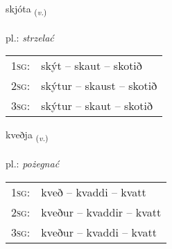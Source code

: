 \documentclass[frontgrid, backgrid]{flacards}\usepackage[]{graphicx}\usepackage[]{xcolor}
\begin{document}
\renewcommand{\blhead}{\vskip5pt {\small\bfseries\footnotesize Sagnorð | Verb }}
\renewcommand{\bcfoot}{\vskip5pt \hspace{2pt}{\small\bfseries\footnotesize 1K}}


{skjóta \small{\textsubscript{(\textit{v.})}} \\[1ex] %
\textphonetic{[scouːta]} \\
pl.: \emph{strzelać} \\  [2ex]
\renewcommand*{\arraystretch}{0.8}
\begin{tabular}{p{1cm}l}
\textsc{1sg}: & skýt -- skaut -- skotið \\ 
\textsc{2sg}: & skýtur -- skaust -- skotið \\ 
\textsc{3sg}: & skýtur -- skaut -- skotið \\ 
\end{tabular}
}

\renewcommand{\flhead}{\vskip5pt \fboxsep=0pt {\small\bfseries\footnotesize Sagnorð | Verb}}
\renewcommand{\fcfoot}{\vskip5pt \fboxsep=0pt \hspace{2pt}{\small\bfseries\footnotesize 1K}}

\renewcommand{\blhead}{\vskip5pt {\small\bfseries\footnotesize Sagnorð | Verb }}
\renewcommand{\bcfoot}{\vskip5pt \hspace{2pt}{\small\bfseries\footnotesize 1K}}


{kveðja \small{\textsubscript{(\textit{v.})}} \\[1ex] %
\textphonetic{[kʰvɛðja]} \\
pl.: \emph{pożegnać} \\  [2ex]
\renewcommand*{\arraystretch}{0.8}
\begin{tabular}{p{1cm}l}
\textsc{1sg}: & kveð -- kvaddi -- kvatt \\ 
\textsc{2sg}: & kveður -- kvaddir -- kvatt \\ 
\textsc{3sg}: & kveður -- kvaddi -- kvatt \\ 
\end{tabular}
}
\end{document}
